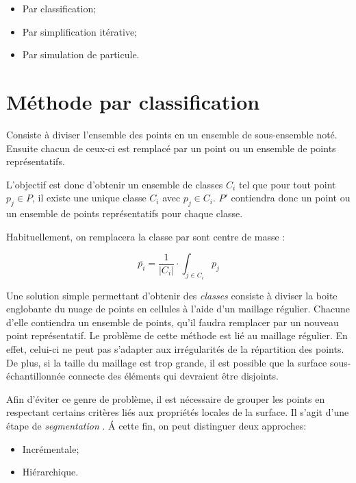 \begin{itemize}
  \item Par classification;
  \item Par simplification itérative;
  \item Par simulation de particule.
\end{itemize}

\section{Méthode par classification}
\begin{definition}
  Consiste à diviser l'ensemble des points en un ensemble de sous-ensemble noté. Ensuite chacun de ceux-ci est remplacé par un point ou un ensemble de points représentatifs.
\end{definition}

L'objectif est donc d'obtenir un ensemble de classes ${C_i}$ tel que pour tout point $p_j\in P$, il existe une unique classe $C_i$ avec $p_j\in C_i$. $P'$ contiendra donc un point ou un ensemble de points représentatifs pour chaque classe.

Habituellement, on remplacera la classe par sont centre de masse :

$$\overline{p_i}=\frac{1}{|C_i|}\cdot\int_{j\in C_i}p_j$$

Une solution simple permettant d'obtenir des \emph{classes} consiste à diviser la boite englobante du nuage de points en cellules à l'aide d'un maillage régulier. Chacune d'elle contiendra un ensemble de points, qu'il faudra remplacer par un nouveau point représentatif.
Le problème de cette méthode est lié au maillage régulier. En effet, celui-ci ne peut pas s'adapter aux irrégularités de la répartition des points. De plus, si la taille du maillage est trop grande, il est possible que la surface sous-échantillonnée connecte des éléments qui devraient être disjoints.

Afin d'éviter ce genre de problème, il est nécessaire de grouper les points en respectant certains critères liés aux propriétés locales de la surface. Il s'agit d'une étape de \emph{segmentation} . \'{A} cette fin, on peut distinguer deux approches:

\begin{itemize}
  \item Incrémentale;
  \item Hiérarchique.
\end{itemize}

